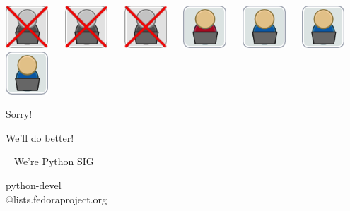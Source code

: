 \documentclass[1610,20pt]{beamer}
\newcommand\sk{\par\bigskip\bigskip\par}
\begin{document}
\begin{center}
\begin{frame}[fragile]
    \includegraphics[width=0.12\textwidth]{Join_OSDeveloper-x} ~~
    \includegraphics[width=0.12\textwidth]{Join_OSDeveloper-x} ~~
    \includegraphics[width=0.12\textwidth]{Join_OSDeveloper-x} ~~ 
    \includegraphics[width=0.12\textwidth]{Join_OSDeveloper-me} ~~
    \includegraphics[width=0.12\textwidth]{Join_OSDeveloper} ~~
    \includegraphics[width=0.12\textwidth]{Join_OSDeveloper} ~~
    \includegraphics[width=0.12\textwidth]{Join_OSDeveloper}
\end{frame}

\begin{frame}[fragile]
    Sorry!

    \sk

    We'll do better!
\end{frame}

\begin{frame}[fragile]~
    {\large We're Python SIG}

    \sk

    python-devel\\{\small @lists.fedoraproject.org}


\end{frame}
\end{center}
\end{document}
